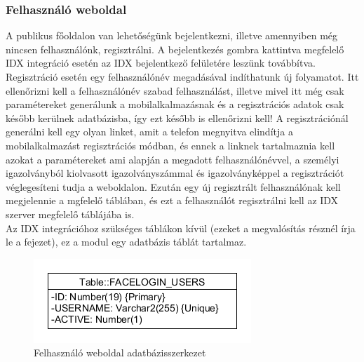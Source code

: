 

\subsubsection{Felhasználó weboldal}
A publikus főoldalon van lehetőségünk bejelentkezni, illetve amennyiben még nincsen felhasználónk, regisztrálni. A bejelentkezés gombra kattintva megfelelő IDX integráció esetén az IDX bejelentkező felületére leszünk továbbítva. Regisztráció esetén egy felhasználónév megadásával indíthatunk új folyamatot. Itt ellenőrizni kell a felhasználónév szabad felhasználást, illetve mivel itt még csak paramétereket generálunk a mobilalkalmazásnak és a regisztrációs adatok csak később kerülnek adatbázisba, így ezt később is ellenőrizni kell! A regisztrációnál generálni kell egy olyan linket, amit a telefon megnyitva elindítja a mobilalkalmazást regisztrációs módban, és ennek a linknek tartalmaznia kell azokat a paramétereket ami alapján a megadott felhasználónévvel, a személyi igazolványból kiolvasott igazolványszámmal és igazolványképpel a regisztrációt véglegesíteni tudja a weboldalon.
Ezután egy új regisztrált felhasználónak kell megjelennie a mgfelelő táblában, és ezt a felhasználót regisztrálni kell az IDX szerver megfelelő táblájába is.
\\Az IDX integrációhoz szükséges táblákon kívül (ezeket a megvalósítás résznél írja le a fejezet), ez a modul egy adatbázis táblát tartalmaz.

\begin{figure}[h]
 \begin{minipage}{1\textwidth} 
\centering
    \includegraphics[scale=0.7]{img/facelogin_db}
    \caption{Felhasználó weboldal adatbázisszerkezet}
 \end{minipage}
\end{figure}


